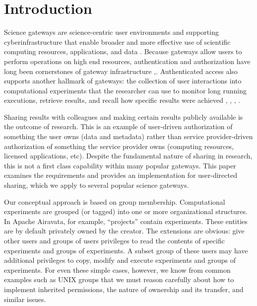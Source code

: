 \documentclass[sigconf]{acmart}
\begin{document}


\maketitle

\section{Introduction}

Science gateways are science-centric user environments and supporting cyberinfrastructure that enable broader and more effective use of scientific computing resources, applications, and data \cite{gatewaySurvey2015}. Because gateways allow users to perform operations on high end resources, authentication and authorization have long been cornerstones of gateway infrastructure \cite{airavataSecurity2016},\cite{welch2007aaaa}. Authenticated access also supports another hallmark of gateways: the collection of user interactions into computational experiments that the researcher can use to monitor long running executions, retrieve results, and recall how specific results were achieved \cite{cipres2010}, \cite{seagridCommunity2016}, \cite{ultrascanAiravata2014}, \cite{nsg2013}. 

Sharing results with colleagues and making certain results publicly available is the outcome of research. This is an example of user-driven authorization of something the user owns (data and metadata) rather than service provider-driven authorization of something the service provider owns (computing resources, licensed applications, etc).  Despite the fundamental nature of sharing in research, this is not a first class capability within many popular gateways. This paper examines the requirements and provides an implementation for user-directed sharing, which we apply to several popular science gateways. 

Our conceptual approach is based on group membership. Computational experiments are grouped (or tagged) into one or more organizational structures. In Apache Airavata, for example, ``projects'' contain experiments. These entities are by default privately owned by the creator.  The extensions are obvious: give other users and groups of users privileges to read the contents of specific experiments and groups of experiments. A subset group of these users may have additional privileges to copy, modify and execute experiments and groups of experiments. For even these simple cases, however, we know from common examples such as UNIX groups that we must reason carefully about how to implement inherited permissions, the nature of ownership and its transfer, and similar issues.
\end{document}
